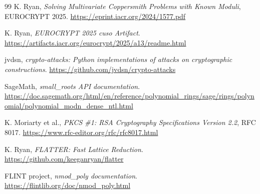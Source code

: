 \documentclass[10pt,a4paper]{article}
\begin{document}
\begin{thebibliography}{99}
K. Ryan,
\emph{Solving Multivariate Coppersmith Problems with Known Moduli},
EUROCRYPT 2025.
\url{https://eprint.iacr.org/2024/1577.pdf}

K. Ryan,
\emph{EUROCRYPT 2025 cuso Artifact}.
\url{https://artifacts.iacr.org/eurocrypt/2025/a13/readme.html}

jvdsn,
\emph{crypto-attacks: Python implementations of attacks on cryptographic
constructions}.
\url{https://github.com/jvdsn/crypto-attacks}

SageMath,
\emph{small\_roots API documentation}.
\url{https://doc.sagemath.org/html/en/reference/polynomial_rings/sage/rings/polynomial/polynomial_modn_dense_ntl.html}

K. Moriarty et al.,
\emph{PKCS \#1: RSA Cryptography Specifications Version 2.2}, RFC 8017.
\url{https://www.rfc-editor.org/rfc/rfc8017.html}

K. Ryan,
\emph{FLATTER: Fast Lattice Reduction}.
\url{https://github.com/keeganryan/flatter}

FLINT project,
\emph{nmod\_poly documentation}.
\url{https://flintlib.org/doc/nmod_poly.html}

\end{thebibliography}
\end{document}

